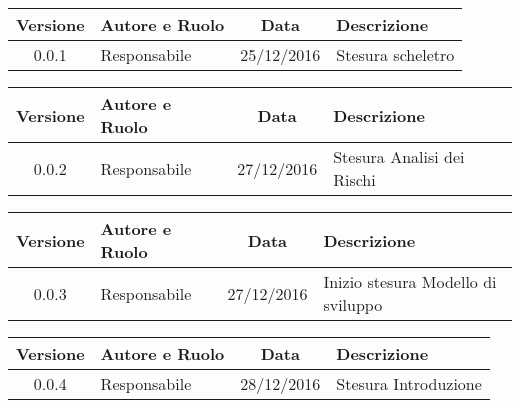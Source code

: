 
\begin{center}
	\begin{tabular}{cp{3cm}cp{3cm}}
	\textbf{Versione} & \textbf{Autore e Ruolo} & \textbf{Data} & \textbf{Descrizione} \\ \hline
	0.0.1 & {\LB} Responsabile & 25/12/2016 & Stesura scheletro \\ \hline
	\end{tabular}
\end{center}
\begin{center}
	\begin{tabular}{cp{3cm}cp{3cm}}
	\textbf{Versione} & \textbf{Autore e Ruolo} & \textbf{Data} & \textbf{Descrizione} \\ \hline
	0.0.2 & {\PB} Responsabile & 27/12/2016 & Stesura Analisi dei Rischi\\ \hline
	\end{tabular}
\end{center}
\begin{center}
	\begin{tabular}{cp{3cm}cp{3cm}}
	\textbf{Versione} & \textbf{Autore e Ruolo} & \textbf{Data} & \textbf{Descrizione} \\ \hline
	0.0.3 & {\LB} Responsabile & 27/12/2016 & Inizio stesura Modello di sviluppo\\ \hline
	\end{tabular}
\end{center}
\begin{center}
	\begin{tabular}{cp{3cm}cp{3cm}}
	\textbf{Versione} & \textbf{Autore e Ruolo} & \textbf{Data} & \textbf{Descrizione} \\ \hline
	0.0.4 & {\PB} Responsabile & 28/12/2016 &  Stesura Introduzione  \\ \hline
	\end{tabular}
\end{center}